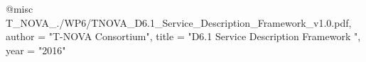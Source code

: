 @misc{ T_NOVA_./WP6/TNOVA_D6.1_Service_Description_Framework_v1.0.pdf,
       author = "{T-NOVA Consortium}",
       title = "D6.1 Service Description Framework ",
       year = "2016" }
